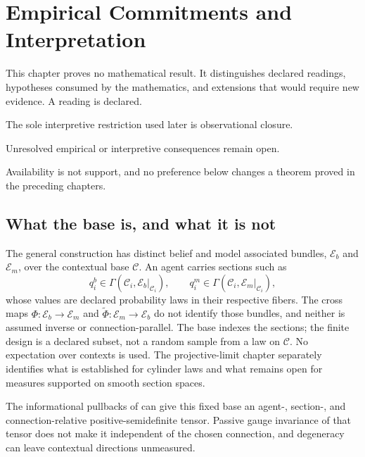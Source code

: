 \chapter{Empirical Commitments and Interpretation}
\label{ch:philosophy}

This chapter proves no mathematical result. It distinguishes declared readings,
hypotheses consumed by the mathematics, and extensions that would require new
evidence. A reading is declared. 

The sole interpretive restriction used later is observational closure.

Unresolved empirical or interpretive consequences remain open. 

Availability is not support, and no preference below changes a theorem proved
in the preceding chapters. 

\section{What the base is, and what it is not}
\label{sec:phil-base}

The general construction has distinct belief and model associated bundles,
\(\mathcal E_b\) and \(\mathcal E_m\), over the contextual base
\(\mathcal C\).  An agent carries sections such as
\begin{equation}
q_i^b\in\Gamma\left(\mathcal C_i,
\mathcal E_b\vert_{\mathcal C_i}\right),
\qquad
q_i^m\in\Gamma\left(\mathcal C_i,
\mathcal E_m\vert_{\mathcal C_i}\right),
\label{eq:phil-fiber-measures}
\end{equation}
whose values are declared probability laws in their respective fibers.  The
cross maps \(\Phi:\mathcal E_b\to\mathcal E_m\) and
\(\widetilde\Phi:\mathcal E_m\to\mathcal E_b\) do not identify those bundles,
and neither is assumed inverse or connection-parallel.  The base indexes the
sections; the finite design is a declared subset, not a random sample from a
law on \(\mathcal C\).  No expectation over contexts is used.  The
projective-limit chapter separately identifies what is established for
cylinder laws and what remains open for measures supported on smooth section
spaces. 

The informational pullbacks of  can give this
fixed base an agent-, section-, and connection-relative positive-semidefinite
tensor.  Passive gauge invariance of that tensor does not make it independent
of the chosen connection, and degeneracy can leave contextual directions
unmeasured. 


